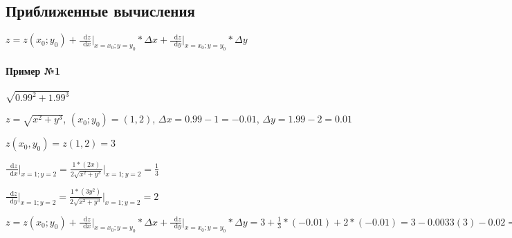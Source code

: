 \documentclass{article}
\newcommand*\diff{\mathop{}\!\mathrm{d}}
\begin{document}
\subsection{Приближенные вычисления}

$z = z (x_0; y_0) + \frac{\diff z}{\diff x} \bigg|_{x = x_0; y = y_0} * \Delta x + \frac{\diff z}{\diff y} \bigg|_{x = x_0; y = y_0} * \Delta y$

\paragraph{Пример №1}

$\sqrt{0.99^2 + 1.99^3}$

$z = \sqrt{x^2 + y^3}$, $(x_0; y_0) = (1, 2)$, $\Delta x = 0.99 - 1 = -0.01$, $\Delta y = 1.99 - 2 = 0.01$

$z(x_0, y_0) = z(1, 2) = 3$

$\frac{\diff z}{\diff x} \bigg|_{x = 1; y = 2} = \frac{1 * (2 x)}{2 \sqrt{x^2 + y^3}} \bigg|_{x = 1; y  = 2} = \frac{1}{3}$

$\frac{\diff z}{\diff y} \bigg|_{x = 1; y = 2} = \frac{1 * (3 y^2)}{2 \sqrt{x^2 + y^3}} \bigg|_{x = 1; y  = 2} = 2$

$z = z (x_0; y_0) + \frac{\diff z}{\diff x} \bigg|_{x = x_0; y = y_0} * \Delta x + \frac{\diff z}{\diff y} \bigg|_{x = x_0; y = y_0} * \Delta y = 3 + \frac{1}{3} * (-0.01) + 2 * (-0.01) = 3 - 0.0033(3) - 0.02 = 2.976(6)$
\end{document}
